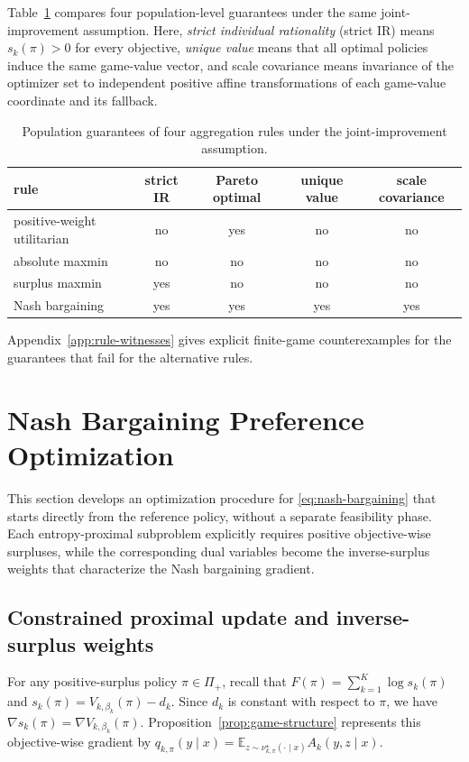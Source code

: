 \documentclass{article}
\theoremstyle{remark}
\theoremstyle{plain}
\newcommand{\E}{\mathbb{E}}
\begin{document}
Table~\ref{tab:rule-guarantees} compares four population-level
guarantees under the same joint-improvement assumption. Here,
\emph{strict individual rationality} (strict IR) means
$s_k(\pi)>0$ for every objective, \emph{unique value} means that all
optimal policies induce the same game-value vector, and scale covariance
means invariance of the optimizer set to independent positive affine
transformations of each game-value coordinate and its fallback.

\begin{table}[htbp]
\centering\footnotesize
\setlength{\tabcolsep}{4.4pt}
\caption{Population guarantees of four aggregation rules under the
joint-improvement assumption.}
\label{tab:rule-guarantees}
\begin{tabular}{lcccc}
\toprule
rule & strict IR & Pareto optimal & unique value & scale covariance\\
\midrule
positive-weight utilitarian & no & yes & no & no\\
absolute maxmin & no & no & no & no\\
surplus maxmin & yes & no & no & no\\
Nash bargaining & yes & yes & yes & yes\\
\bottomrule
\end{tabular}
\end{table}

Appendix~\ref{app:rule-witnesses} gives explicit finite-game
counterexamples for the guarantees that fail for the alternative rules.

\section{Nash Bargaining Preference Optimization}
\label{sec:algorithm}
This section develops an optimization procedure for \eqref{eq:nash-bargaining} that starts directly from the reference policy, without a separate feasibility phase. Each entropy-proximal subproblem explicitly requires positive objective-wise surpluses, while the corresponding dual variables become the inverse-surplus weights that characterize the Nash bargaining gradient.

\subsection{Constrained proximal update and inverse-surplus weights}

For any positive-surplus policy $\pi\in\Pi_+$, recall that $F(\pi)=\sum_{k=1}^K\log s_k(\pi)$ and $s_k(\pi)=V_{k,\beta_k}(\pi)-d_k$.
Since $d_k$ is constant with respect to $\pi$, we have $\nabla s_k(\pi)=\nabla V_{k,\beta_k}(\pi)$. Proposition~\ref{prop:game-structure} represents this objective-wise gradient by
$q_{k,\pi}(y\mid x)=\E_{z\sim\nu^\star_{k,\pi}(\cdot\mid x)}A_k(y,z\mid x)$.
\end{document}
